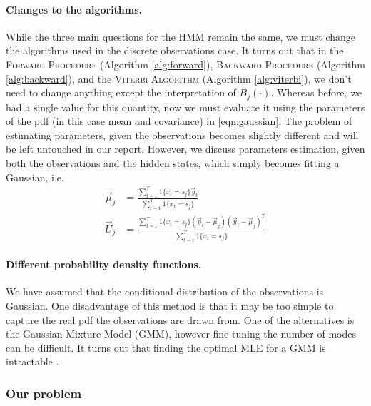 \paragraph{Changes to the algorithms.}
	While the three main questions for the HMM remain the same, we must change the algorithms used in the discrete observations case. It turns out that in the \textsc{Forward Procedure} (Algorithm \ref{alg:forward}), \textsc{Backward Procedure} (Algorithm \ref{alg:backward}), and the \textsc{Viterbi Algorithm} (Algorithm \ref{alg:viterbi}), we don't need to change anything except the interpretation of $B_j(\cdot)$. Whereas before, we had a single value for this quantity, now we must evaluate it using the parameters of the pdf (in this case mean and covariance) in \eqref{eqn:gaussian}. The problem of estimating parameters, given the observations becomes slightly different and will be left untouched in our report. However, we discuss parameters estimation, given both the observations and the hidden states, which simply becomes fitting a Gaussian, i.e.
	\begin{align}
		\vec\mu_j & = \frac{\sum_{t = 1}^T 1\{x_t = s_j\} \vec y_t}{\sum_{t = 1}^T 1\{x_t = s_j\}} \\
		\vec U_j & = \frac{\sum_{t = 1}^T 1\{x_t = s_j\} (\vec y_t - \vec\mu_j)(\vec y_t - \vec\mu_j)^T}{\sum_{t = 1}^T 1\{x_t = s_j\}}
	\end{align}

\paragraph{Different probability density functions.}
	We have assumed that the conditional distribution of the observations is Gaussian. One disadvantage of this method is that it may be too simple to capture the real pdf the observations are drawn from. One of the alternatives is the Gaussian Mixture Model (GMM), however fine-tuning the number of modes can be difficult. It turns out that finding the optimal MLE for a GMM is intractable \cite{mlBook}.
	
\subsubsection{Our problem}
